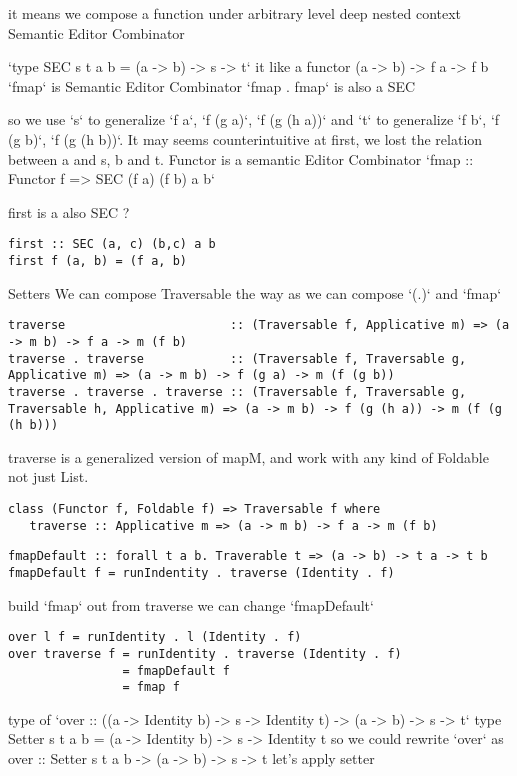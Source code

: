 it means we compose a function under arbitrary level deep nested context
Semantic Editor Combinator

`type SEC s t a b = (a -> b) -> s -> t`
it like a functor (a -> b) -> f a -> f b
`fmap` is Semantic Editor Combinator
`fmap . fmap` is also a SEC

so we use `s` to generalize `f a`,  `f (g a)`, `f (g (h a))` and `t` to generalize `f b`,  `f (g b)`, `f (g (h b))`.
It may seems counterintuitive at first, we lost the relation between a and s, b and t.
Functor is a semantic Editor Combinator
`fmap :: Functor f => SEC (f a) (f b) a b`

first is a also SEC ?
\begin{verbatim}
first :: SEC (a, c) (b,c) a b
first f (a, b) = (f a, b)
\end{verbatim}
Setters
We can compose Traversable the way as we can compose `(.)` and `fmap`

\begin{verbatim}
traverse                       :: (Traversable f, Applicative m) => (a -> m b) -> f a -> m (f b)
traverse . traverse            :: (Traversable f, Traversable g, Applicative m) => (a -> m b) -> f (g a) -> m (f (g b))
traverse . traverse . traverse :: (Traversable f, Traversable g, Traversable h, Applicative m) => (a -> m b) -> f (g (h a)) -> m (f (g (h b)))
\end{verbatim}

traverse is a generalized version of mapM, and work with any kind of Foldable not just List.

\begin{verbatim}
class (Functor f, Foldable f) => Traversable f where
   traverse :: Applicative m => (a -> m b) -> f a -> m (f b)
\end{verbatim}

\begin{verbatim}
fmapDefault :: forall t a b. Traverable t => (a -> b) -> t a -> t b
fmapDefault f = runIndentity . traverse (Identity . f)
\end{verbatim}

build `fmap` out from traverse
we can change `fmapDefault`

\begin{verbatim}
over l f = runIdentity . l (Identity . f)
over traverse f = runIdentity . traverse (Identity . f)
                = fmapDefault f
                = fmap f
\end{verbatim}

type of `over :: ((a -> Identity b) -> s -> Identity t) -> (a -> b) -> s -> t`
type Setter s t a b = (a -> Identity b) -> s -> Identity t
so we could rewrite `over` as
over :: Setter s t a b -> (a -> b) -> s -> t
let’s apply setter

